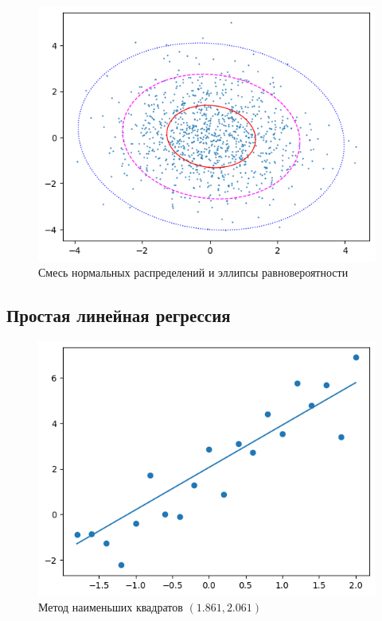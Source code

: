 \documentclass[12pt,a4paper]{article}
\begin{document}
	\begin{figure}[htbp!]
		\begin{center}
			\includegraphics[width = 1\linewidth]{graphics/lab5_normal.png}
			\caption{Смесь нормальных распределений и эллипсы равновероятности}
		\end{center}
	\end{figure}

	\subsection{Простая линейная регрессия}

	\begin{figure}[htbp!]
		\begin{center}
			\includegraphics[width = 1\linewidth]{graphics/lab6_sq.png}
			\caption{Метод наименьших квадратов \( (1.861, 2.061) \)}
		\end{center}
	\end{figure}
\end{document}
